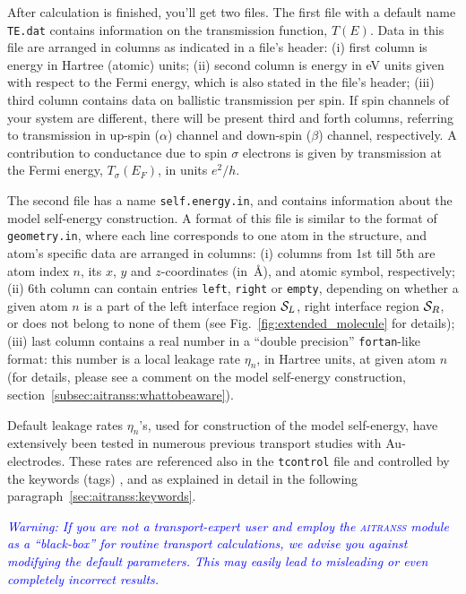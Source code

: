 After calculation is finished, you'll get two files. The first file with
a default name \verb,TE.dat, contains information on the transmission
function, $T(E)$. Data in this file are arranged in columns as indicated
in a file's header: (i) first column is energy in Hartree (atomic) units;
(ii) second column is energy in eV units given with respect to the Fermi
energy, which is also stated in the file's header; (iii) third column
contains data on ballistic transmission per spin. If spin channels of
your system are different, there will be present third and forth columns,
referring to transmission in up-spin ($\alpha$) channel and down-spin 
($\beta$) channel, respectively. A contribution to conductance due to 
spin $\sigma$ electrons is given by transmission at the Fermi
energy, $T_{\sigma}(E_F)$, in units $e^2/h$.

The second file has a name \verb,self.energy.in,, and contains information
about the model self-energy construction. A format of this file is similar
to the format of \verb,geometry.in,, where each line corresponds to one
atom in the structure, and atom's specific data are arranged in columns:
(i) columns from 1st till 5th are atom index $n$, its $x$, $y$ and
$z$-coordinates (in~\AA), and atomic symbol, respectively; (ii) 6th column
can contain entries \verb,left,, \verb,right, or \verb,empty,, depending
on whether a given atom $n$ is a part of the left interface region ${\cal
S}_L$, right interface region ${\cal S}_R$, or does not belong to none
of them (see Fig.~\ref{fig:extended_molecule} for details);  (iii) last
column contains a real number in a ``double precision'' \verb,fortan,-like
format: this number is a local leakage rate $\eta_n$, in Hartree units,
at given atom $n$ (for details, please see a comment on the model
self-energy construction, section~\ref{subsec:aitranss:whattobeaware}).

Default leakage rates $\eta_n$'s, used for construction of the
model self-energy, have extensively been tested in numerous previous
transport studies with Au-electrodes.  These rates are referenced
also in the \verb,tcontrol, file and controlled by the keywords (tags)
,  and  as explained in
detail in the following paragraph~\ref{sec:aitranss:keywords}.

\textcolor{blue}{\emph{Warning: If you are not a transport-expert user
and employ the \textsc{aitranss} module as a ``black-box'' for routine
transport calculations, we advise you against modifying the default
parameters.  This may easily lead to misleading or even completely
incorrect results. } }

